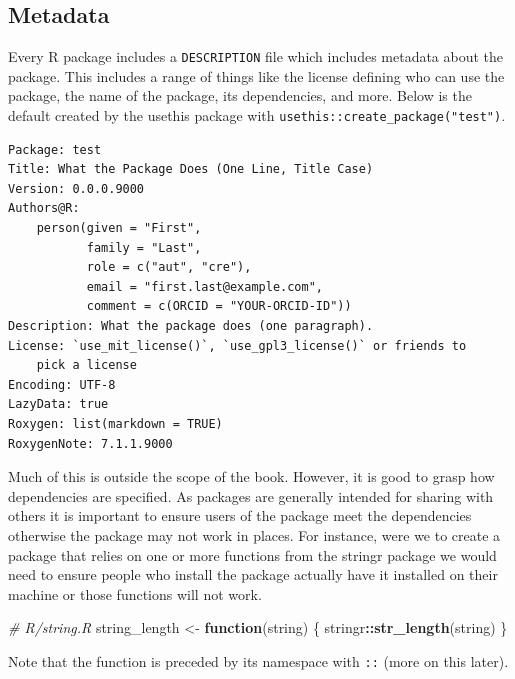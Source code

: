 \documentclass[
]{krantz}
\makeatletter
\newenvironment{Shaded}{\begin{snugshade}}{\end{snugshade}}
\newcommand{\CommentTok}[1]{\textcolor[rgb]{0.37,0.37,0.37}{\textit{#1}}}
\newcommand{\ControlFlowTok}[1]{\textcolor[rgb]{0.27,0.27,0.27}{\textbf{#1}}}
\newcommand{\KeywordTok}[1]{\textcolor[rgb]{0.27,0.27,0.27}{\textbf{#1}}}
\newcommand{\NormalTok}[1]{#1}
\newcommand{\OperatorTok}[1]{\textcolor[rgb]{0.43,0.43,0.43}{\textbf{#1}}}
\newcommand{\StringTok}[1]{\textcolor[rgb]{0.5,0.5,0.5}{#1}}
\newenvironment{kframe}{%
\medskip{}
\setlength{\fboxsep}{.8em}
 \def\at@end@of@kframe{}%
 \ifinner\ifhmode%
  \def\at@end@of@kframe{\end{minipage}}%
  \begin{minipage}{\columnwidth}%
 \fi\fi%
 \def\FrameCommand##1{\hskip\@totalleftmargin \hskip-\fboxsep
 \colorbox{shadecolor}{##1}\hskip-\fboxsep
     \hskip-\linewidth \hskip-\@totalleftmargin \hskip\columnwidth}%
 \MakeFramed {\advance\hsize-\width
   \@totalleftmargin\z@ \linewidth\hsize
   \@setminipage}}%
 {\par\unskip\endMakeFramed%
 \at@end@of@kframe}
\renewenvironment{Shaded}{\begin{kframe}}{\end{kframe}}
\newenvironment{rmdblock}[1]
  {
  \begin{itemize}
  \renewcommand{\labelitemi}{
    \raisebox{-.7\height}[0pt][0pt]{
      {\setkeys{Gin}{width=3em,keepaspectratio}\texttt{[image: images/\#1]}}
    }
  }
  \setlength{\fboxsep}{1em}
  \begin{kframe}
  \item
  }
  {
  \end{kframe}
  \end{itemize}
  }
\newenvironment{rmdnote}
  {\begin{rmdblock}{note}}
  {\end{rmdblock}}
\makeatother
\begin{document}
\hypertarget{metadata}{%
\subsection{Metadata}\label{metadata}}

Every R package includes a \texttt{DESCRIPTION} file which includes metadata about the package. This includes a range of things like the license defining who can use the package, the name of the package, its dependencies, and more. Below is the default created by the usethis package with \texttt{usethis::create\_package("test")}.

\begin{verbatim}
Package: test
Title: What the Package Does (One Line, Title Case)
Version: 0.0.0.9000
Authors@R: 
    person(given = "First",
           family = "Last",
           role = c("aut", "cre"),
           email = "first.last@example.com",
           comment = c(ORCID = "YOUR-ORCID-ID"))
Description: What the package does (one paragraph).
License: `use_mit_license()`, `use_gpl3_license()` or friends to
    pick a license
Encoding: UTF-8
LazyData: true
Roxygen: list(markdown = TRUE)
RoxygenNote: 7.1.1.9000
\end{verbatim}

Much of this is outside the scope of the book. However, it is good to grasp how dependencies are specified. As packages are generally intended for sharing with others it is important to ensure users of the package meet the dependencies otherwise the package may not work in places. For instance, were we to create a package that relies on one or more functions from the stringr \citep{R-stringr} package we would need to ensure people who install the package actually have it installed on their machine or those functions will not work.

\begin{Shaded}
\begin{Highlighting}[]
\CommentTok{\# R/string.R}
\NormalTok{string\_length <{-}}\StringTok{ }\ControlFlowTok{function}\NormalTok{(string) \{}
\NormalTok{  stringr}\OperatorTok{::}\KeywordTok{str\_length}\NormalTok{(string)}
\NormalTok{\}}
\end{Highlighting}
\end{Shaded}

\begin{rmdnote}
Note that the function is preceded by its namespace with \texttt{::}
(more on this later).
\end{rmdnote}
\end{document}
